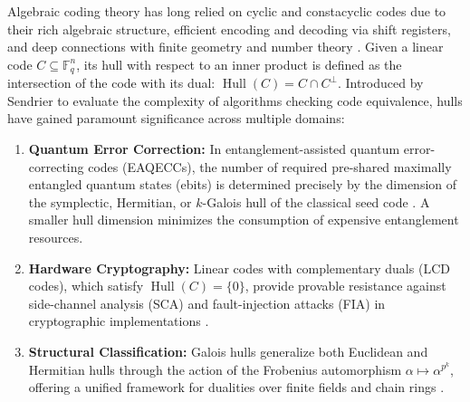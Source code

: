 \documentclass[preprint,12pt]{elsarticle}
\numberwithin{equation}{section}
\theoremstyle{plain}
\theoremstyle{definition}
\theoremstyle{remark}
\begin{document}
Algebraic coding theory has long relied on cyclic and constacyclic codes due to their rich algebraic structure, efficient encoding and decoding via shift registers, and deep connections with finite geometry and number theory \cite{Huffman2003,Lidl1997,MacWilliams1977}. Given a linear code $C \subseteq \mathbb{F}_q^n$, its hull with respect to an inner product is defined as the intersection of the code with its dual: $\operatorname{Hull}(C) = C \cap C^\perp$. Introduced by Sendrier \cite{Sendrier1997} to evaluate the complexity of algorithms checking code equivalence, hulls have gained paramount significance across multiple domains:
\begin{enumerate}
    \item \textbf{Quantum Error Correction:} In entanglement-assisted quantum error-correcting codes (EAQECCs), the number of required pre-shared maximally entangled quantum states (ebits) is determined precisely by the dimension of the symplectic, Hermitian, or $k$-Galois hull of the classical seed code \cite{Brun2006,Wilde2008,Qian2018}. A smaller hull dimension minimizes the consumption of expensive entanglement resources.
    \item \textbf{Hardware Cryptography:} Linear codes with complementary duals (LCD codes), which satisfy $\operatorname{Hull}(C) = \{0\}$, provide provable resistance against side-channel analysis (SCA) and fault-injection attacks (FIA) in cryptographic implementations \cite{Carlet2018,Li2017,Boonniyoma2020}.
    \item \textbf{Structural Classification:} Galois hulls generalize both Euclidean and Hermitian hulls through the action of the Frobenius automorphism $\alpha \mapsto \alpha^{p^k}$, offering a unified framework for dualities over finite fields and chain rings \cite{Fan2018,Sangwisut2015,Yadav2026}.
\end{enumerate}
\end{document}
